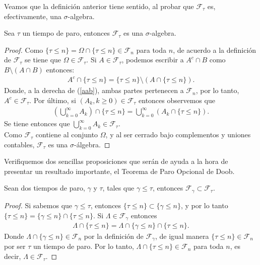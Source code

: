 Veamos que la definición anterior tiene sentido, al probar que $\mathcal{F}_{\tau}$ es, efectivamente, una $\sigma$-algebra.
\begin{proposition}
	Sea $\tau$ un tiempo de paro, entonces $\mathcal{F}_{\tau}$ es una $\sigma$-algebra.
\end{proposition}
\begin{proof}
	Como $\{ \tau \leq n \} = \Omega \cap \{ \tau \leq n \} \in \mathcal{F}_n$ para toda $n$, de acuerdo a la definición de $\mathcal{F}_{\tau}$ se tiene que $\Omega \in \mathcal{F}_{\tau}$. Si $A \in \mathcal{F}_{\tau}$, podemos escribir a $A^{c} \cap B$ como $B \setminus (A \cap B)$ entonces:
	\begin{align}
		A^{c} \cap \{ \tau \leq n \} = \{ \tau \leq n \} \setminus (A \cap \{ \tau \leq n \}). \label{aab}
	\end{align}
	Donde, a la derecha de (\ref{aab}), ambas partes pertenecen a $\mathcal{F}_{n}$, por lo tanto, $A^{c} \in \mathcal{F}_{\tau}$. Por último, si $(A_k, k \geq 0) \in \mathcal{F}_{\tau}$ entonces observemos que
	\begin{align*}
		\left(\bigcup_{k=0}^{\infty} A_k\right) \cap \{ \tau \leq n \} = \bigcup_{k=0}^{\infty} (A_k \cap \{ \tau \leq n \}).
	\end{align*}
	Se tiene entonces que $\bigcup_{k=0}^{\infty} A_k \in \mathcal{F}_{\tau}$. \\
	
	Como $\mathcal{F}_{\tau}$ contiene al conjunto $\Omega$, y al ser cerrado bajo complementos y uniones contables,  $\mathcal{F}_{\tau}$ es una $\sigma$-álgebra.
\end{proof}

Verifiquemos dos sencillas proposiciones que serán de ayuda a la hora de presentar un resultado importante, el  Teorema de Paro Opcional de Doob.
\begin{proposition}
\label{inclu}
	Sean dos tiempos de paro, $\gamma$ y $\tau$, tales que $\gamma \leq \tau$, entonces $\mathcal{F}_{\gamma} \subset \mathcal{F}_{\tau}$.
\end{proposition}
\begin{proof}
	Si sabemos que $\gamma \leq \tau$, entonces $\{ \tau \leq n \} \subset \{ \gamma \leq n \}$, y por lo tanto $\{ \tau \leq n \} = \{ \gamma \leq n \} \cap \{ \tau \leq n \}$. Si $\Lambda \in \mathcal{F}_{\gamma}$ entonces
	\begin{align*}
		\Lambda \cap \{ \tau \leq n \} = \Lambda \cap \{ \gamma \leq n \} \cap \{ \tau \leq n \}.
	\end{align*}
	Donde $\Lambda \cap \{ \gamma \leq n \} \in \mathcal{F}_n$ por la definición de $\mathcal{F}_{\gamma}$, de igual manera $\{ \tau \leq n \} \in \mathcal{F}_n$ por ser $\tau$ un tiempo de paro. Por lo tanto, $\Lambda \cap \{ \tau \leq n \} \in \mathcal{F}_n$ para toda $n$, es decir, $\Lambda \in \mathcal{F}_{\tau}$.
\end{proof}


